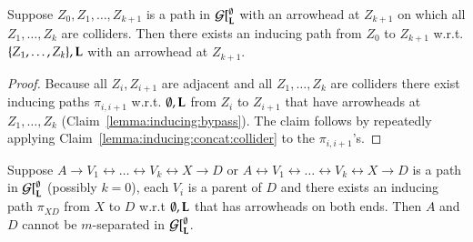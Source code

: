\begin{claim}\label{lemma:inducing:concat:colliderseq}
Suppose $Z_0,Z_1,\ldots,Z_{k+1}$ is a path in ${\cal G}[^\emptyset_{\bf L}$ 
with an arrowhead at $Z_{k+1}$ on which all $Z_1, \ldots, Z_k$ are colliders. 
Then there exists an inducing path from $Z_0$ to $Z_{k+1}$ w.r.t.  $\{Z_1, \ldots, Z_k\},{\bf L}$ with an arrowhead at $Z_{k+1}$.
\end{claim}

\begin{proof}
Because all $Z_i, Z_{i+1}$ are adjacent and all $Z_1, \ldots, Z_k$ are colliders 
there exist inducing paths $\pi_{i,i+1}$ w.r.t. $\emptyset, {\bf L}$ from $Z_i$ to $Z_{i+1}$ that have   arrowheads at $Z_1, \ldots, Z_k$ 
(Claim~\ref{lemma:inducing:bypass}).
The claim follows by repeatedly applying Claim~\ref{lemma:inducing:concat:collider} to the $\pi_{i,i+1}$'s.
\end{proof}



\begin{lemma}
\label{lemma:inducing:adjacent:when:visible}
Suppose $A \to V_1 \leftrightarrow \ldots \leftrightarrow V_k \leftrightarrow X \to D$ or $A \leftrightarrow V_1 \leftrightarrow \ldots \leftrightarrow V_k \leftrightarrow X \to D$ is a path in ${\cal G}[^\emptyset_{\bf L}$ (possibly $k=0$), each $V_i$ is a parent of $D$ %
and there exists an inducing path $\pi_{XD}$ from $X$ to $D$ w.r.t $\emptyset, {\bf L}$ that has arrowheads on both ends.
Then $A$ and $D$ cannot be $m$-separated in  ${\cal G}[^\emptyset_{\bf L}$.
\end{lemma}



